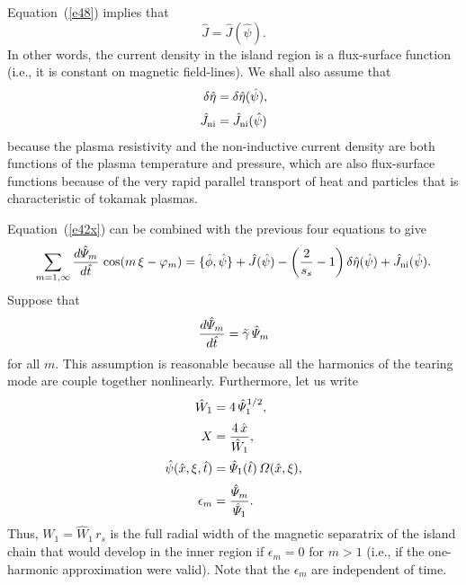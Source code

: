\documentclass[12pt,prb,aps]{revtex4-1}
\begin{document}
Equation~(\ref{e48}) implies that
\begin{equation}
\hat{J}= \hat{J}(\hat{\psi}).
\end{equation}
In other words, the current density in the island region is a flux-surface function (i.e., it is constant on magnetic field-lines). We shall also assume that
\begin{align}
\delta\hat{\eta}  &= \delta\hat{\eta}(\hat{\psi}),\\[0.5ex]
\hat{J}_{\rm ni} &= \hat{J}_{\rm ni}(\hat{\psi})
\end{align}
because the plasma resistivity and the non-inductive current density are both functions of the plasma temperature and pressure, which are also flux-surface functions because of the very rapid parallel transport of heat and particles that is characteristic of tokamak plasmas. 

Equation~(\ref{e42x}) can be combined with the previous four equations to give
\begin{equation}\label{e41x}
\sum_{m=1,\infty}\frac{d\hat{\mit\Psi}_m}{d\hat{t}}\,\cos(m\,\xi-\varphi_m) = \{\hat{\phi},\hat{\psi}\}
+\hat{J}(\hat{\psi}) -\left(\frac{2}{s_s}-1\right)
\delta\hat{\eta}(\hat{\psi}) + \hat{J}_{\rm ni}(\hat{\psi}).
\end{equation}
Suppose that 
\begin{equation}\label{e42}
\frac{d\hat{\mit\Psi}_m}{d\hat{t}}=\tilde{\gamma}\,\hat{\mit\Psi}_m
\end{equation}
for all $m$. This assumption is reasonable because all  the harmonics of the tearing mode are couple together nonlinearly. Furthermore, let us write
\begin{align}
\hat{W}_1 &= 4\,\hat{\mit\Psi}_1^{1/2},\label{e43}\\[0.5ex]
X &= \frac{4\,\hat{x}}{\hat{W}_1},\label{e44}\\[0.5ex]
\hat{\psi}(\hat{x},\xi,\hat{t}) &= \hat{\mit\Psi}_1(\hat{t})\,{\mit\Omega}(\hat{x},\xi),\\[0.5ex]
\epsilon_m &= \frac{\hat{\mit\Psi}_m}{\hat{\mit\Psi}_1}.\label{e46}
\end{align}
Thus, $W_1=\hat{W}_1\,r_s$ is the full radial width of the magnetic separatrix of the island chain that would develop in the inner region if $\epsilon_m=0$ for $m>1$ (i.e., if the one-harmonic approximation were valid).  Note that the $\epsilon_m$ are independent of time. 
\end{document}
